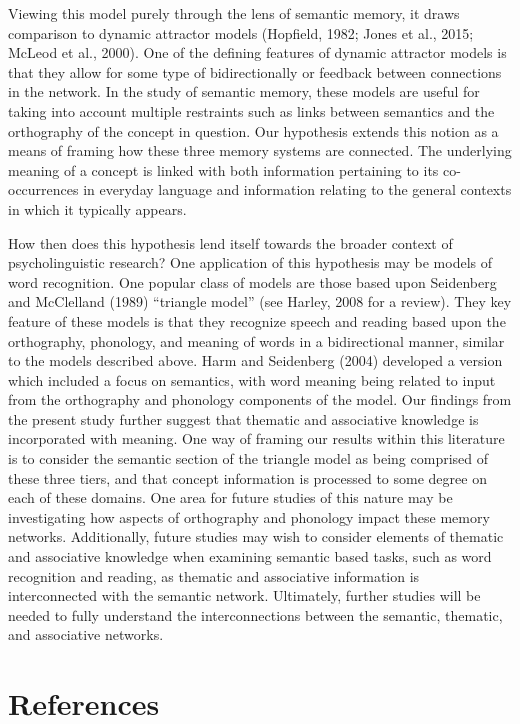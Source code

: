 \documentclass[english,man]{apa6}
\theoremstyle{definition}
\theoremstyle{definition}
\theoremstyle{definition}
\theoremstyle{remark}
\begin{document}
Viewing this model purely through the lens of semantic memory, it draws
comparison to dynamic attractor models (Hopfield, 1982; Jones et al.,
2015; McLeod et al., 2000). One of the defining features of dynamic
attractor models is that they allow for some type of bidirectionally or
feedback between connections in the network. In the study of semantic
memory, these models are useful for taking into account multiple
restraints such as links between semantics and the orthography of the
concept in question. Our hypothesis extends this notion as a means of
framing how these three memory systems are connected. The underlying
meaning of a concept is linked with both information pertaining to its
co-occurrences in everyday language and information relating to the
general contexts in which it typically appears.

How then does this hypothesis lend itself towards the broader context of
psycholinguistic research? One application of this hypothesis may be
models of word recognition. One popular class of models are those based
upon Seidenberg and McClelland (1989) \enquote{triangle model} (see
Harley, 2008 for a review). They key feature of these models is that
they recognize speech and reading based upon the orthography, phonology,
and meaning of words in a bidirectional manner, similar to the models
described above. Harm and Seidenberg (2004) developed a version which
included a focus on semantics, with word meaning being related to input
from the orthography and phonology components of the model. Our findings
from the present study further suggest that thematic and associative
knowledge is incorporated with meaning. One way of framing our results
within this literature is to consider the semantic section of the
triangle model as being comprised of these three tiers, and that concept
information is processed to some degree on each of these domains. One
area for future studies of this nature may be investigating how aspects
of orthography and phonology impact these memory networks. Additionally,
future studies may wish to consider elements of thematic and associative
knowledge when examining semantic based tasks, such as word recognition
and reading, as thematic and associative information is interconnected
with the semantic network. Ultimately, further studies will be needed to
fully understand the interconnections between the semantic, thematic,
and associative networks.

\newpage

\section{References}\label{references}
\end{document}
